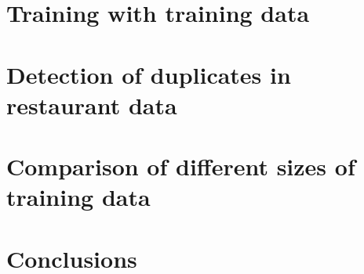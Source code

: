 \documentclass[conference]{IEEEtran}
\begin{document}
\section{Training with training data}\label{training}

\section{Detection of duplicates in restaurant data}\label{duplicate_detection}

\section{Comparison of different sizes of training data}\label{comparison}

\section{Conclusions}







\printbibliography
\end{document}

